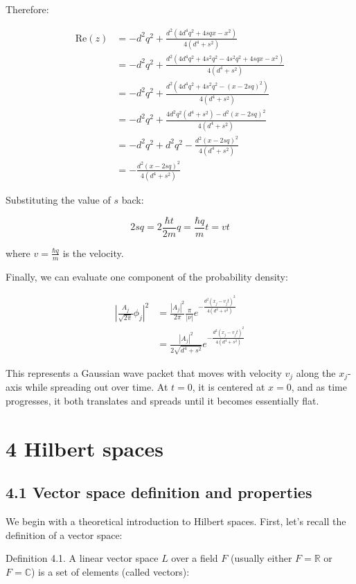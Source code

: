 \documentclass[italian]{HKNdocument}
\begin{document}
Therefore:

\begin{align*}
\text{Re}(z) &= -d^2q^2+\frac{d^2(4d^4q^2+4sqx-x^2)}{4(d^4+s^2)} \\
&= -d^2q^2+\frac{d^2(4d^4q^2+4s^2q^2-4s^2q^2+4sqx-x^2)}{4(d^4+s^2)} \\
&= -d^2q^2+\frac{d^2(4d^4q^2+4s^2q^2-(x-2sq)^2)}{4(d^4+s^2)} \\
&= -d^2q^2+\frac{4d^2q^2(d^4+s^2)-d^2(x-2sq)^2}{4(d^4+s^2)} \tag{3.21} \\
&= -d^2q^2+d^2q^2-\frac{d^2(x-2sq)^2}{4(d^4+s^2)} \\
&= -\frac{d^2(x-2sq)^2}{4(d^4+s^2)}
\end{align*}

Substituting the value of $s$ back:

\begin{equation*}
2sq = 2\frac{\hbar t}{2m}q = \frac{\hbar q}{m}t = vt \tag{3.22}
\end{equation*}

where $v = \frac{\hbar q}{m}$ is the velocity.

Finally, we can evaluate one component of the probability density:

\begin{align*}
\left|\frac{A_j}{\sqrt{2\pi}}\phi_j\right|^2 &= \frac{|A_j|^2}{2\pi}\frac{\pi}{|\nu|}e^{-\frac{d^2(x_j-v_jt)^2}{4(d^4+s^2)}} \\
&= \frac{|A_j|^2}{2\sqrt{d^4+s^2}}e^{-\frac{d^2(x_j-v_jt)^2}{4(d^4+s^2)}} \tag{3.23}
\end{align*}

This represents a Gaussian wave packet that moves with velocity $v_j$ along the $x_j$-axis while spreading out over time. At $t=0$, it is centered at $x=0$, and as time progresses, it both translates and spreads until it becomes essentially flat.

\section*{4 Hilbert spaces}
\subsection*{4.1 Vector space definition and properties}

We begin with a theoretical introduction to Hilbert spaces. First, let's recall the definition of a vector space:

Definition 4.1. A linear vector space $L$ over a field $F$ (usually either $F=\mathbb{R}$ or $F=\mathbb{C}$) is a set of elements (called vectors):
\end{document}
